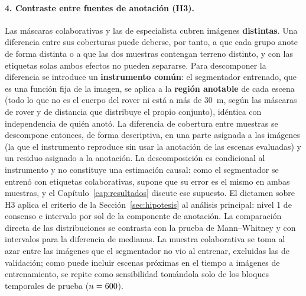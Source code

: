 \paragraph{4. Contraste entre fuentes de anotación (H3).} Las máscaras colaborativas y las de
especialista cubren imágenes \textbf{distintas}. Una diferencia entre sus coberturas puede
deberse, por tanto, a que cada grupo anote de forma distinta o a que las dos muestras contengan
terreno distinto, y con las etiquetas solas ambos efectos no pueden separarse. Para descomponer la diferencia se
introduce un \textbf{instrumento común}: el segmentador entrenado, que es una función fija de la
imagen, se aplica a la \textbf{región anotable} de cada escena (todo lo que no es el cuerpo del
rover ni está a más de \SI{30}{\metre}, según las máscaras de rover y de distancia que distribuye
el propio conjunto), idéntica con independencia de quién anotó. La diferencia de cobertura entre
muestras se descompone entonces, de forma descriptiva, en una parte asignada a las imágenes (la
que el instrumento reproduce sin usar la anotación de las escenas evaluadas) y un residuo
asignado a la anotación. La descomposición es condicional al instrumento y no constituye una
estimación causal: como el segmentador se entrenó con etiquetas colaborativas, supone que su
error es el mismo en ambas muestras, y el Capítulo~\ref{cap:resultados} discute ese supuesto.
El dictamen sobre H3 aplica el criterio de la Sección~\ref{sec:hipotesis} al análisis principal:
nivel 1 de consenso e intervalo por sol de la componente de anotación. La comparación directa de las distribuciones se contrasta con la prueba de
Mann--Whitney y con intervalos para la diferencia de medianas. La muestra colaborativa se toma
al azar entre las imágenes que el segmentador no vio al entrenar, excluidas las de validación;
como puede incluir escenas próximas en el tiempo a imágenes de entrenamiento, se repite como
sensibilidad tomándola solo de los bloques temporales de prueba ($n = \num{600}$).

